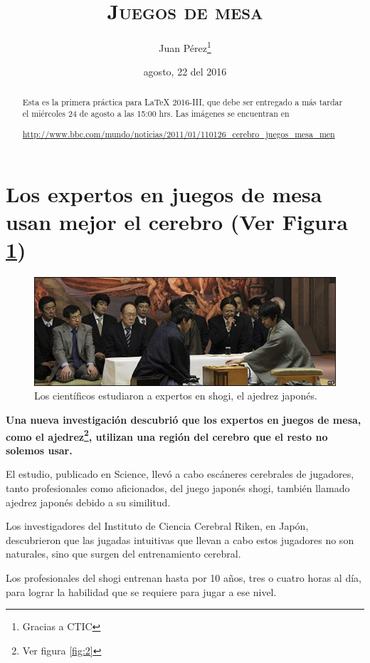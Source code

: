 \documentclass[12pt,a4paper]{article}
\title{\scshape Juegos de mesa}
\author{Juan Pérez\thanks{Gracias a CTIC}}
\date{agosto, 22 del 2016}
\begin{document}
\maketitle
\tableofcontents
\listoffigures
\listoftables

\begin{abstract}
Esta es la primera práctica para LaTeX 2016-III, que debe ser entregado a más tardar el miércoles 24 de agosto a las 15:00 hrs. Las imágenes se encuentran en

\url{http://www.bbc.com/mundo/noticias/2011/01/110126_cerebro_juegos_mesa_men}
\end{abstract}

\section{Los expertos en juegos de mesa usan mejor el cerebro (Ver Figura \ref{fig:1})}

\begin{figure}[H]
	\centering
	\includegraphics[scale=0.5]{fig1}
	\caption{Los científicos estudiaron a expertos en shogi, el ajedrez japonés.}\label{fig:1}
\end{figure}

{\bfseries Una nueva investigación descubrió que los expertos en juegos de mesa, como el ajedrez\footnote{Ver figura \ref{fig:2}}, utilizan una región del cerebro que el resto no solemos usar.}

{\sffamily El estudio, publicado en Science, llevó a cabo escáneres cerebrales de jugadores, tanto profesionales como aficionados, del juego japonés shogi, también llamado ajedrez japonés debido a su similitud.}

Los investigadores del Instituto de Ciencia Cerebral Riken, en Japón, descubrieron que las jugadas intuitivas que llevan a cabo estos jugadores no son naturales, sino que surgen del entrenamiento cerebral.

Los profesionales del shogi entrenan hasta por 10 años, tres o cuatro horas al día, para lograr la habilidad que se requiere para jugar a ese nivel.
\end{document}
